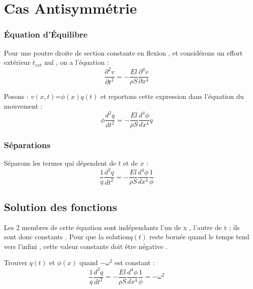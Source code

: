 \documentclass[a4paper,10pt]{report} %
\begin{document}
 


\chapter{Cas Antisymmétrie}
\subsection{Équation d'Équilibre}

Pour une poutre droite de section constante en flexion , et considérons un effort extérieur $t_{ext}$ nul , on a l'équation :
\begin{equation}
    \frac{\partial^2v}{\partial{t}^2}=-\frac{El}{\rho S}\frac{\partial^4{v}}{\partial{x}^4}
	\label{equantion1}
\end{equation}


Posons : $v(x,t)$=$\phi(x)q(t)$ et reportons cette expression dans l'équation du mouvement :
\begin{equation}
	\phi\frac{d^2{q}}{d{t}^2}=-\frac{El}{\rho S}\frac{d^4{\phi}}{d{x}^4}q
	\label{equantion2}
\end{equation}


\subsection{Séparations}
Séparons les termes qui dépendent de $t$ et de $x$ :
\begin{equation}
    \frac{1}{q}\frac{d^2{q}}{d{t}^2}=-\frac{El}{\rho S}\frac{d^4{\phi}}{d{x}^4}\frac{1}{\phi}
    \label{equantion3}
\end{equation}

\section{Solution des fonctions}

Les 2 membres de cette équation sont indépendants l'un de x , l'autre de t ; ils sont donc constants . Pour que la solution$q(t)$ reste bornée quand le temps tend vers l'infini , cette valeur constante doit être négative .
\begin{center}
Trouver $q(t)$ et $\phi(x)$ quand $-\omega^2$ est constant :
	\begin{equation}
		\frac{1}{q}\frac{d^2{q}}{d{t}^2}=-\frac{El}{\rho S}\frac{d^4{\phi}}{d{x}^4}\frac{1}{\phi}=-\omega^2
		\label{equation4}
	\end{equation}
\end{center}
\end{document}
